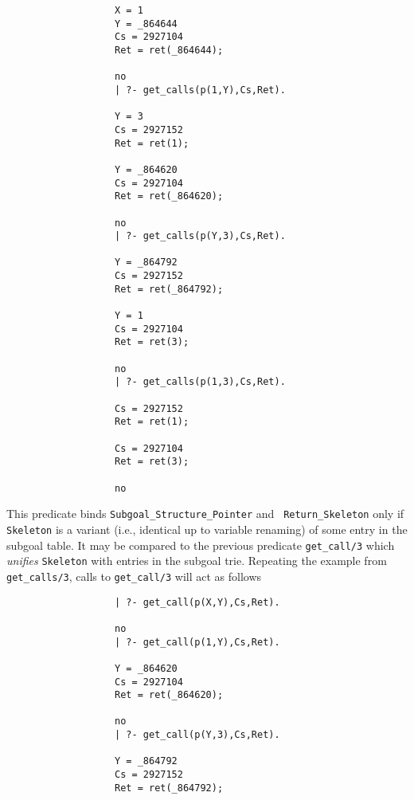 \begin{description}
{\begin{verbatim}
                   X = 1
                   Y = _864644
                   Cs = 2927104
                   Ret = ret(_864644);

                   no
                   | ?- get_calls(p(1,Y),Cs,Ret).

                   Y = 3
                   Cs = 2927152
                   Ret = ret(1);

                   Y = _864620
                   Cs = 2927104
                   Ret = ret(_864620);

                   no
                   | ?- get_calls(p(Y,3),Cs,Ret).

                   Y = _864792
                   Cs = 2927152
                   Ret = ret(_864792);

                   Y = 1
                   Cs = 2927104
                   Ret = ret(3);

                   no
                   | ?- get_calls(p(1,3),Cs,Ret).

                   Cs = 2927152
                   Ret = ret(1);

                   Cs = 2927104
                   Ret = ret(3);

                   no

	\end{verbatim}
	}

%
This predicate binds {\tt Subgoal\_Structure\_Pointer} and {\tt
Return\_Skeleton} only if {\tt Skeleton} is a variant (i.e., identical
up to variable renaming) of some entry in the subgoal table.  It may
be compared to the previous predicate {\tt get\_call/3} which {\em
unifies} {\tt Skeleton} with entries in the subgoal trie.  Repeating
the example from {\tt get\_calls/3}, calls to {\tt get\_call/3} will
act as follows

%
{\footnotesize 
\begin{verbatim}
                   | ?- get_call(p(X,Y),Cs,Ret).

                   no
                   | ?- get_call(p(1,Y),Cs,Ret).

                   Y = _864620
                   Cs = 2927104
                   Ret = ret(_864620);

                   no
                   | ?- get_call(p(Y,3),Cs,Ret).

                   Y = _864792
                   Cs = 2927152
                   Ret = ret(_864792);


\end{verbatim}}
\end{description}
